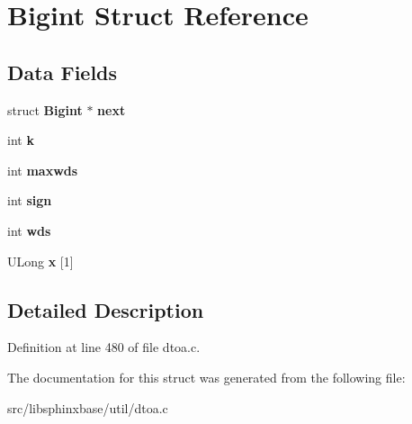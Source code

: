 \section{Bigint Struct Reference}
\label{structBigint}
\subsection*{Data Fields}
\begin{DoxyCompactItemize}
\item 
struct {\bf Bigint} $\ast$ {\bfseries next}\label{structBigint_a3a1296e26ef617e775d5e366e390e7fc}

\item 
int {\bfseries k}\label{structBigint_a032d76e80da2f21df10c0794244d12f2}

\item 
int {\bfseries maxwds}\label{structBigint_a5ffcac6f95ded3bc1fc23204f46f10d0}

\item 
int {\bfseries sign}\label{structBigint_a4380eb98f7653bb74d8377c0d68d6cb7}

\item 
int {\bfseries wds}\label{structBigint_aa737992ebddb9d6a7e2d23bfecdb080e}

\item 
U\-Long {\bfseries x} [1]\label{structBigint_ae56981315f471a190603887aee98ca99}

\end{DoxyCompactItemize}


\subsection{Detailed Description}


Definition at line 480 of file dtoa.\-c.



The documentation for this struct was generated from the following file\-:\begin{DoxyCompactItemize}
\item 
src/libsphinxbase/util/dtoa.\-c\end{DoxyCompactItemize}
